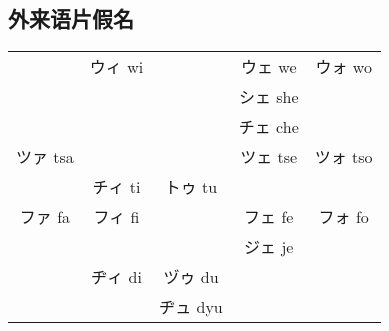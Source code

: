 \begin{appendices}
    \renewcommand{\thechapter}{\Alph{chapter}.}
    
    \section{外来语片假名}

    \begin{table}[!htbp]
        \centering
        \begin{tabular}{ccccc}
            \hline
                     & ウィ wi &          & ウェ we  & ウォ wo  \\
                     &         &          & シェ she &          \\
                     &         &          & チェ che &          \\
            ツァ tsa &         &          & ツェ tse & ツォ tso \\
                     & チィ ti & トゥ tu  &          &          \\
            ファ fa  & フィ fi &          & フェ fe  & フォ fo  \\
                     &         &          & ジェ je  &          \\
                     & ヂィ di & ヅゥ du  &          &          \\
                     &         & ヂュ dyu &          &          \\
            \hline
        \end{tabular}
    \end{table}

\end{appendices}